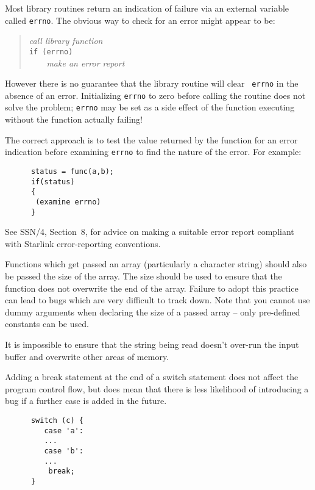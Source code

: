 
Most library routines return an indication of failure via an external 
variable called {\tt errno}.
The obvious way to check for an error might appear to be:
\begin{quote}
    {\sl call library function}\\
    {\tt if (errno)}\\
    {\sl  \ \ \ \ make an error report}
\end{quote}
However there is no guarantee that the library routine will clear {\tt 
errno} in the absence of an error. Initializing {\tt errno} to zero
before  calling the routine does not solve the problem;
{\tt errno} may be set as
a side effect of the function executing without the function actually failing!

The correct approach is to test the value returned by the function
for an error indication
before examining {\tt errno} to find the nature of the error. For example:
\begin{verbatim}
      status = func(a,b);
      if(status)
      {
       (examine errno)
      }
\end{verbatim}
See SSN/4, Section~8,  for advice on making a suitable error report
compliant with Starlink error-reporting conventions.



Functions which get passed an array (particularly a 
character string) should also be passed the size of the array.
The size should be used to ensure that the function does not overwrite the 
end of the array.
Failure to adopt this practice can lead to bugs which are very difficult to 
track down.
Note that you cannot use dummy arguments when declaring the size of a 
passed array -- only pre-defined constants can be used.


It is impossible to ensure that the string being
read doesn't over-run the input buffer and overwrite other areas of memory.




Adding a break statement at the end of a switch statement does not
affect the program control flow, but does mean that there
is less likelihood of introducing a bug if a further case is added
in the future. 
\begin{verbatim}
      switch (c) {
         case 'a':
         ...
         case 'b':
         ...
          break;
      }
\end{verbatim}

